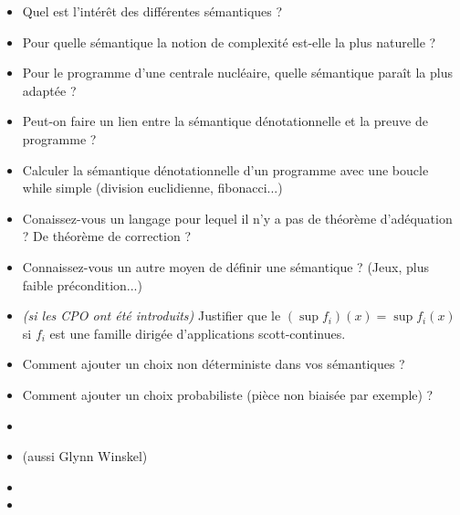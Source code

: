 \documentclass{agregfiche}
\begin{document}
\begin{itemize}
    \item Quel est l'intérêt des différentes sémantiques ?
    \item Pour quelle sémantique la notion de complexité est-elle 
        la plus naturelle ?
    \item Pour le programme d'une centrale nucléaire, quelle sémantique 
        paraît la plus adaptée ?
    \item Peut-on faire un lien entre la sémantique dénotationnelle
        et la preuve de programme ?
    \item Calculer la sémantique dénotationnelle d'un programme 
        avec une boucle while simple (division euclidienne, fibonacci...)
    \item Conaissez-vous un langage pour lequel il n'y a pas 
        de théorème d'adéquation ? De théorème de correction ?
    \item Connaissez-vous un autre moyen de définir une sémantique ?
        (Jeux, plus faible précondition...)
    \item \emph{(si les CPO ont été introduits)}
        Justifier que le $(\sup f_i) (x) = \sup f_i (x)$
        si $f_i$ est une famille dirigée d'applications 
        scott-continues.
    \item Comment ajouter un choix non déterministe dans 
        vos sémantiques ?
    \item Comment ajouter un choix probabiliste (pièce non biaisée par exemple)
        ?
\end{itemize}

\secreferences

\begin{itemize}
\item {}
\item {}
    (aussi Glynn Winskel)
\end{itemize}

\secdev

\begin{itemize}
\item {}
\item {}
\end{itemize}
\end{document}

